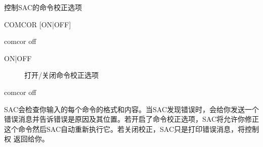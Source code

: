 \label{cmd:comcor}

控制SAC的命令校正选项

\begin{SACSTX}
COMCOR [ON|OFF]
\end{SACSTX}

\begin{SACDFT}
comcor off
\end{SACDFT}

\begin{description}
\item [ON|OFF] 打开/关闭命令校正选项
\end{description}

\begin{SACDFT}
comcor off
\end{SACDFT}

SAC会检查你输入的每个命令的格式和内容。当SAC发现错误时，会给你发送一个
错误消息并告诉错误是原因及其位置。若开启了命令校正选项，SAC将允许你修正
这个命令然后SAC自动重新执行它。若关闭校正，SAC只是打印错误消息，将控制权
返回给你。
